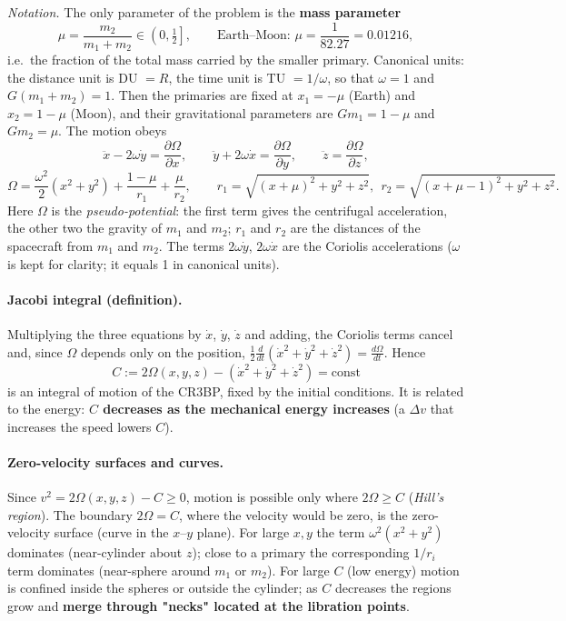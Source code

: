 \emph{Notation.} The only parameter of the problem is the \textbf{mass parameter}
\begin{equation}
\mu=\frac{m_2}{m_1+m_2}\in\left(0,\tfrac12\right],\qquad \text{Earth--Moon: }\mu=\frac{1}{82.27}=0.01216,
\end{equation}
i.e.\ the fraction of the total mass carried by the smaller primary. Canonical units: the distance unit is DU $=R$, the time unit is
TU $=1/\omega$, so that $\omega=1$ and $G(m_1+m_2)=1$. Then the primaries are fixed at $x_1=-\mu$ (Earth) and $x_2=1-\mu$ (Moon),
and their gravitational parameters are $Gm_1=1-\mu$ and $Gm_2=\mu$. The motion obeys
\begin{equation}
\ddot{x}-2\omega\dot{y}=\frac{\partial\Omega}{\partial x},\qquad
\ddot{y}+2\omega\dot{x}=\frac{\partial\Omega}{\partial y},\qquad
\ddot{z}=\frac{\partial\Omega}{\partial z},
\end{equation}
\begin{equation}
\Omega=\frac{\omega^{2}}{2}(x^{2}+y^{2})+\frac{1-\mu}{r_1}+\frac{\mu}{r_2},\qquad
r_1=\sqrt{(x+\mu)^{2}+y^{2}+z^{2}},\ \ r_2=\sqrt{(x+\mu-1)^{2}+y^{2}+z^{2}} .
\end{equation}
Here $\Omega$ is the \emph{pseudo-potential}: the first term gives the centrifugal acceleration, the other two the gravity of
$m_1$ and $m_2$; $r_1$ and $r_2$ are the distances of the spacecraft from $m_1$ and $m_2$. The terms $2\omega\dot y$, $2\omega\dot x$
are the Coriolis accelerations ($\omega$ is kept for clarity; it equals 1 in canonical units).

\paragraph{Jacobi integral (definition).} Multiplying the three equations by $\dot x$, $\dot y$, $\dot z$ and adding, the Coriolis terms
cancel and, since $\Omega$ depends only on the position, $\frac12\frac{d}{dt}(\dot x^2+\dot y^2+\dot z^2)=\frac{d\Omega}{dt}$. Hence
\begin{equation}
C:=2\Omega(x,y,z)-\left(\dot{x}^{2}+\dot{y}^{2}+\dot{z}^{2}\right)=\text{const}
\end{equation}
is an integral of motion of the CR3BP, fixed by the initial conditions. It is related to the energy: \textbf{$C$ decreases as the
mechanical energy increases} (a $\Delta v$ that increases the speed lowers $C$).

\paragraph{Zero-velocity surfaces and curves.} Since $v^2=2\Omega(x,y,z)-C\ge0$, motion is possible only where $2\Omega\ge C$
(\emph{Hill's region}). The boundary $2\Omega=C$, where the velocity would be zero, is the zero-velocity surface (curve in the
$x$--$y$ plane). For large $x,y$ the term $\omega^2(x^2+y^2)$ dominates (near-cylinder about $z$); close to a primary the
corresponding $1/r_i$ term dominates (near-sphere around $m_1$ or $m_2$). For large $C$ (low energy) motion is confined
inside the spheres or outside the cylinder; as $C$ decreases the regions grow and \textbf{merge through "necks" located at the
libration points}.

